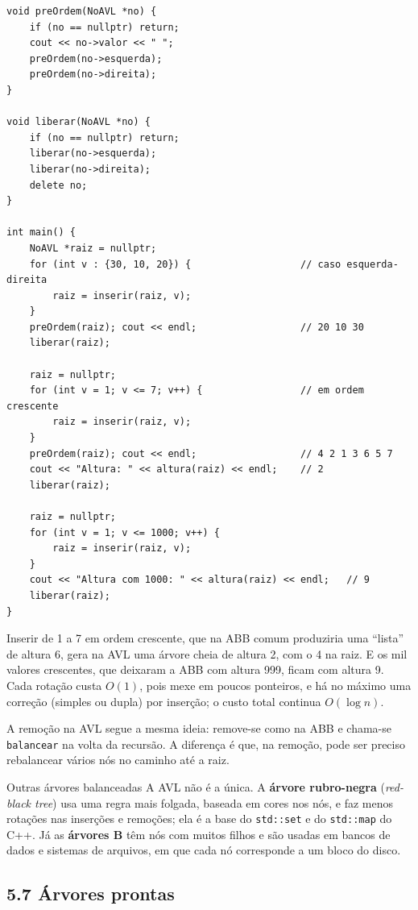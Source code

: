 \begin{codigo}
\begin{Verbatim}[breaklines=true, breaksymbolleft={}, fontsize=\footnotesize]
void preOrdem(NoAVL *no) {
    if (no == nullptr) return;
    cout << no->valor << " ";
    preOrdem(no->esquerda);
    preOrdem(no->direita);
}

void liberar(NoAVL *no) {
    if (no == nullptr) return;
    liberar(no->esquerda);
    liberar(no->direita);
    delete no;
}

int main() {
    NoAVL *raiz = nullptr;
    for (int v : {30, 10, 20}) {                   // caso esquerda-direita
        raiz = inserir(raiz, v);
    }
    preOrdem(raiz); cout << endl;                  // 20 10 30
    liberar(raiz);

    raiz = nullptr;
    for (int v = 1; v <= 7; v++) {                 // em ordem crescente
        raiz = inserir(raiz, v);
    }
    preOrdem(raiz); cout << endl;                  // 4 2 1 3 6 5 7
    cout << "Altura: " << altura(raiz) << endl;    // 2
    liberar(raiz);

    raiz = nullptr;
    for (int v = 1; v <= 1000; v++) {
        raiz = inserir(raiz, v);
    }
    cout << "Altura com 1000: " << altura(raiz) << endl;   // 9
    liberar(raiz);
}
\end{Verbatim}
\end{codigo}

Inserir de 1 a 7 em ordem crescente, que na ABB comum produziria uma ``lista'' de altura 6, gera na AVL uma árvore cheia de altura 2, com o 4 na raiz. E os mil valores crescentes, que deixaram a ABB com altura 999, ficam com altura 9. Cada rotação custa $O(1)$, pois mexe em poucos ponteiros, e há no máximo uma correção (simples ou dupla) por inserção; o custo total continua $O(\log n)$.

A remoção na AVL segue a mesma ideia: remove-se como na ABB e chama-se \texttt{balancear} na volta da recursão. A diferença é que, na remoção, pode ser preciso rebalancear vários nós no caminho até a raiz.

\begin{destaque}{Outras árvores balanceadas}
A AVL não é a única. A \textbf{árvore rubro-negra} (\textit{red-black tree}) usa uma regra mais folgada, baseada em cores nos nós, e faz menos rotações nas inserções e remoções; ela é a base do \texttt{std::set} e do \texttt{std::map} do C++. Já as \textbf{árvores B} têm nós com muitos filhos e são usadas em bancos de dados e sistemas de arquivos, em que cada nó corresponde a um bloco do disco.
\end{destaque}

\subsection{5.7 Árvores prontas}

